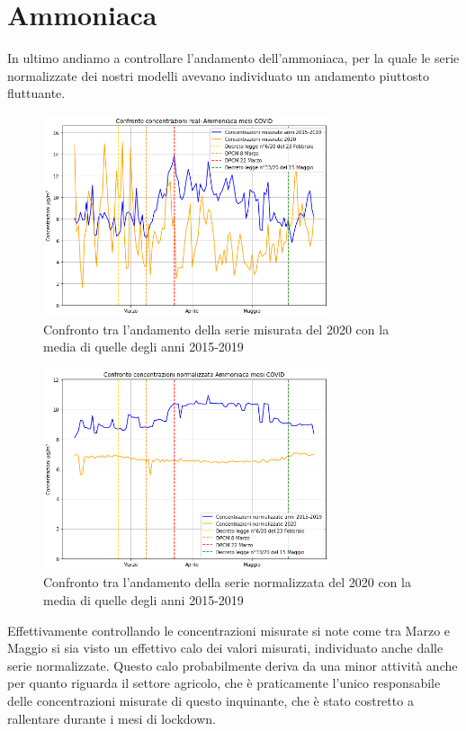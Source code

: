 \section{Ammoniaca}
In ultimo andiamo a controllare l'andamento dell'ammoniaca, per la quale le serie normalizzate dei nostri modelli avevano individuato un andamento piuttosto fluttuante.

\begin{figure}[h]
\centering
\includegraphics[width=0.75\textwidth]{ammoniaca_covid}
\caption{Confronto tra l'andamento della serie misurata del 2020 con la media di quelle degli anni 2015-2019}
\label{fig:ammoniaca_covid}
\end{figure}

\begin{figure}[h]
\centering
\includegraphics[width=0.75\textwidth]{ammoniaca_covid_norm}
\caption{Confronto tra l'andamento della serie normalizzata del 2020 con la media di quelle degli anni 2015-2019}
\label{fig:ammoniaca_covid_norm}
\end{figure}

Effettivamente controllando le concentrazioni misurate si note come tra Marzo e Maggio si sia visto un effettivo calo dei valori misurati, individuato anche dalle serie normalizzate.
Questo calo probabilmente deriva da una minor attività anche per quanto riguarda il settore agricolo, che è praticamente l'unico responsabile delle concentrazioni misurate di questo inquinante, che è stato costretto a rallentare durante i mesi di lockdown.

